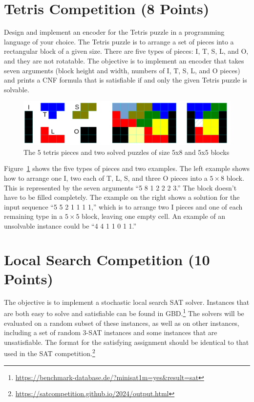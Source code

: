 \documentclass{article}
\begin{document}
\section{Tetris Competition (8 Points)}

Design and implement an encoder for the Tetris puzzle in a programming language of your choice.
The Tetris puzzle is to arrange a set of pieces into a rectangular block of a given size.
There are five types of pieces: I, T, S, L, and O, and they are not rotatable.
The objective is to implement an encoder that takes seven arguments (block height and width, numbers of I, T, S, L, and O pieces) and prints a CNF formula that is satisfiable if and only the given Tetris puzzle is solvable.

\begin{figure}[h]
    \centering
    \includegraphics[width=\linewidth]{tetris.pdf}
    \caption{The 5 tetris pieces and two solved puzzles of size 5x8 and 5x5 blocks}
    \label{fig:tetris}
\end{figure}

Figure~\ref{fig:tetris} shows the five types of pieces and two examples.
The left example shows how to arrange one I, two each of T, L, S, and three O pieces into a $5 \times 8$ block.
This is represented by the seven arguments ``5 8 1 2 2 2 3.''
The block doesn't have to be filled completely.
The example on the right shows a solution for the input sequence ``5 5 2 1 1 1 1,'' which is to arrange two I pieces and one of each remaining type in a $5 \times 5$ block, leaving one empty cell.
An example of an unsolvable instance could be ``4 4 1 1 0 1 1.''

\section{Local Search Competition (10 Points)}

The objective is to implement a stochastic local search SAT solver.
Instances that are both easy to solve and satisfiable can be found in GBD.\footnote{\url{https://benchmark-database.de/?minisat1m=yes&result=sat}}
The solvers will be evaluated on a random subset of these instances, as well as on other instances, including a set of random 3-SAT instances and some instances that are unsatisfiable.
The format for the satisfying assignment should be identical to that used in the SAT competition.\footnote{\url{https://satcompetition.github.io/2024/output.html}}
\end{document}
